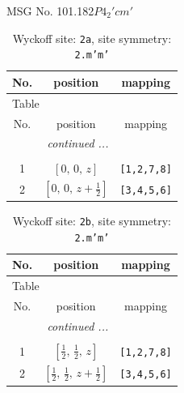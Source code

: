\documentclass[fleqn,8pt]{jsarticle}
\begin{document}
\setcounter{MaxMatrixCols}{32}

\renewcommand{\tablename}{Table~}
\renewcommand{\figurename}{Figure~}
\begin{center}
\LARGE
MSG No. 101.182\quad$P4_{2}'cm'$
\end{center}
\renewcommand{\arraystretch}{1.2}
\begin{longtable}{ccc}
\caption{Wyckoff site: {\tt 2a}, site symmetry: {\tt 2.m'm'}}
 \\
 \hline \hline
No. & position & mapping \\ \hline \endfirsthead

\multicolumn{2}{l}{\tablename\ \thetable{}} \\
 \hline \hline
No. & position & mapping \\ \hline \endhead

 \hline \hline
\multicolumn{2}{r}{\footnotesize\it continued ...} \\ \endfoot

 \hline \hline
\multicolumn{2}{r}{} \\ \endlastfoot

1 & $\left[ 0,\, 0,\, z \right]$ & {\tt [1,2,7,8]} \\ \hline
2 & $\left[ 0,\, 0,\, z + \frac{1}{2} \right]$ & {\tt [3,4,5,6]} \\
\end{longtable}
\renewcommand{\arraystretch}{1.2}
\begin{longtable}{ccc}
\caption{Wyckoff site: {\tt 2b}, site symmetry: {\tt 2.m'm'}}
 \\
 \hline \hline
No. & position & mapping \\ \hline \endfirsthead

\multicolumn{2}{l}{\tablename\ \thetable{}} \\
 \hline \hline
No. & position & mapping \\ \hline \endhead

 \hline \hline
\multicolumn{2}{r}{\footnotesize\it continued ...} \\ \endfoot

 \hline \hline
\multicolumn{2}{r}{} \\ \endlastfoot

1 & $\left[ \frac{1}{2},\, \frac{1}{2},\, z \right]$ & {\tt [1,2,7,8]} \\ \hline
2 & $\left[ \frac{1}{2},\, \frac{1}{2},\, z + \frac{1}{2} \right]$ & {\tt [3,4,5,6]} \\
\end{longtable}
\end{document}
